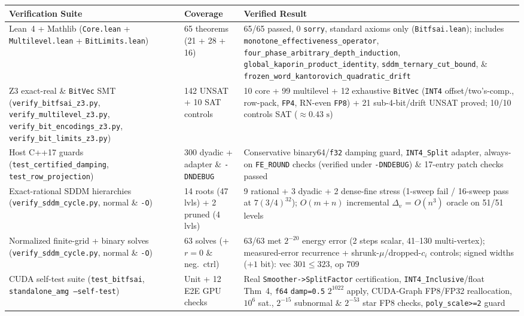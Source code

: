 \documentclass[10pt]{article}
\begin{document}
\begin{table}[t]
\centering\scriptsize
\begin{tabular}{@{}p{}p{}p{}@{}}
\toprule
Verification Suite & Coverage & Verified Result \\
\midrule
Lean~4 + Mathlib (\texttt{Core.lean} + \texttt{Multilevel.lean} + \texttt{BitLimits.lean}) & 65 theorems (21 + 28 + 16) & 65/65 passed, 0 \texttt{sorry}, standard axioms only (\texttt{Bitfsai.lean}); includes \texttt{monotone\_effectiveness\_operator}, \texttt{four\_phase\_arbitrary\_depth\_induction}, \texttt{global\_kaporin\_product\_identity}, \texttt{sddm\_ternary\_cut\_bound}, \& \texttt{frozen\_word\_kantorovich\_quadratic\_drift} \\
Z3 exact-real \& \texttt{BitVec} SMT (\texttt{verify\_bitfsai\_z3.py}, \texttt{verify\_multilevel\_z3.py}, \texttt{verify\_bit\_encodings\_z3.py}, \texttt{verify\_bit\_limits\_z3.py}) & 142 UNSAT + 10 SAT controls & 10 core + 99 multilevel + 12 exhaustive \texttt{BitVec} (\texttt{INT4} offset/two's-comp., row-pack, \texttt{FP4}, RN-even \texttt{FP8}) + 21 sub-4-bit/drift UNSAT proved; 10/10 controls SAT ($\approx 0.43\text{ s}$) \\
Host C++17 guards (\texttt{test\_certified\_damping}, \texttt{test\_row\_projection}) & 300 dyadic + adapter \& \texttt{-DNDEBUG} & Conservative binary64/\texttt{f32} damping guard, \texttt{INT4\_Split} adapter, always-on \texttt{FE\_ROUND} checks (verified under \texttt{-DNDEBUG}) \& 17-entry patch checks passed \\
Exact-rational SDDM hierarchies (\texttt{verify\_sddm\_cycle.py}, normal \& \texttt{-O}) & 14 roots (47 lvls) + 2 pruned (4 lvls) & 9 rational + 3 dyadic + 2 dense-fine stress (1-sweep fail / 16-sweep pass at $7(3/4)^{32}$); $O(m+n)$ incremental $\Delta_v$ = $O(n^3)$ oracle on 51/51 levels \\
Normalized finite-grid + binary solves (\texttt{verify\_sddm\_cycle.py}, normal \& \texttt{-O}) & 63 solves (+ $r=0$ \& neg.\ ctrl) & 63/63 met $2^{-20}$ energy error (2 steps scalar, 41--130 multi-vertex); measured-error recurrence + shrunk-$\mu$/dropped-$c_i$ controls; signed widths ($+1$ bit): vec $301 \le 323$, op $709$ \\
CUDA self-test suite (\texttt{test\_bitfsai}, \texttt{standalone\_amg --self-test}) & Unit + 12 E2E GPU checks & Real \texttt{Smoother->SplitFactor} certification, \texttt{INT4\_Inclusive}/float Thm~4, \texttt{f64} \texttt{damp=0.5} $2^{1022}$ apply, CUDA-Graph FP8/FP32 reallocation, $10^6$ sat., $2^{-15}$ subnormal \& $2^{-53}$ star FP8 checks, \texttt{poly\_scale>=2} guard \\

\end{tabular}
\end{table}
\end{document}
